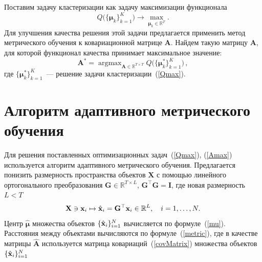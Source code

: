 Поставим задачу кластеризации как задачу максимизации функционала
\begin{equation}
\label{Qmax}
Q \bigl(\{\boldsymbol{\mu}_k\}_{k=1}^K\bigr) \to \max_{\boldsymbol{\mu}_k \in \mathbb{R}^T}.
\end{equation}
Для улучшения качества решения этой задачи предлагается применить метод метрического обучения к ковариационной матрице $\mathbf{A}$.
Найдем такую матрицу $\mathbf{A}$, для которой функционал качества принимает максимальное значение:
\begin{equation}
\label{Amax}
\mathbf{A}^* = \mathop{\arg \max}_{\mathbf{A} \in \mathbb{R}^{T \times T}} Q \bigl(\{\boldsymbol{\mu}_k^*\}_{k=1}^K \bigr)\,,
\end{equation}
где $\{\boldsymbol{\mu}_k^*\}_{k=1}^K$~--- решение задачи кластеризации~(\ref{Qmax}).

\section{Алгоритм адаптивного метрического обучения}
Для решения поставленных оптимизационных задач~(\ref{Qmax}), (\ref{Amax}) используется алгоритм адаптивного метрического обучения.
Предлагается понизить размерность пространства объектов $\mathbf{X}$ с помощью линейного ортогонального преобразования $\mathbf{G} \in \mathbb{R}^{T \times L}$, $\mathbf{G}^{\top} \mathbf{G} = \mathbf{I}$, где новая размерность $L < T$
\[
\mathbf{X} \ni \mathbf{x}_i  \mapsto \hat{\mathbf{x}}_i = \mathbf{G}^\top \mathbf{x}_i \in \mathbb{R}^L, \quad i = 1, \ldots, N.
\]
Центр $\hat{\boldsymbol{\mu}}$ множества объектов $\{\hat{\mathbf{x}}_i\}_{i=1}^N$ вычисляется по формуле~(\ref{mu}). Расстояния между объектами вычисляются по формуле~(\ref{metric}), где в качестве матрицы $\hat{\mathbf{A}}$ используется матрица ковариаций~(\ref{covMatrix}) множества объектов $\{\hat{\mathbf{x}}_i\}_{i=1}^N$

